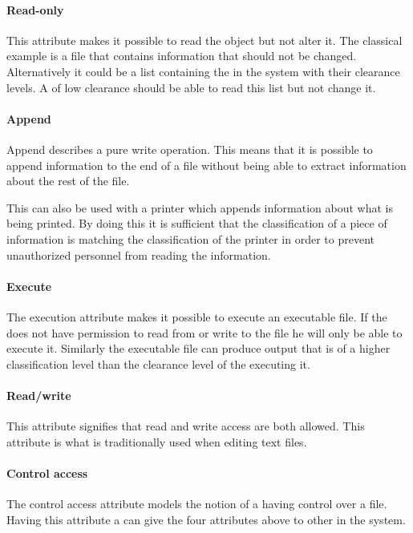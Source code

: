 \paragraph{Read-only}
This attribute makes it possible to read the object but not alter it.
The classical example is a file that contains information that should not be changed.
Alternatively it could be a list containing the \principals{} in the system with their clearance levels.
A \principal{} of low clearance should be able to read this list but not change it.

\paragraph{Append}
Append describes a pure write operation.
This means that it is possible to append information to the end of a file without being able to extract information about the rest of the file.

This can also be used with a printer which appends information about what is being printed.
By doing this it is sufficient that the classification of a piece of information is matching the classification of the printer in order to prevent unauthorized personnel from reading the information.

\paragraph{Execute}
The execution attribute makes it possible to execute an executable file.
If the \principal{} does not have permission to read from or write to the file he will only be able to execute it.
Similarly the executable file can produce output that is of a higher classification level than the clearance level of the \principal{} executing it.

\paragraph{Read/write}
This attribute signifies that read and write access are both allowed.
This attribute is what is traditionally used when editing text files.

\paragraph{Control access}
The control access attribute models the notion of a \principal{} having control over a file.
Having this attribute a \principal{} can give the four attributes above to other \principals{} in the system.

